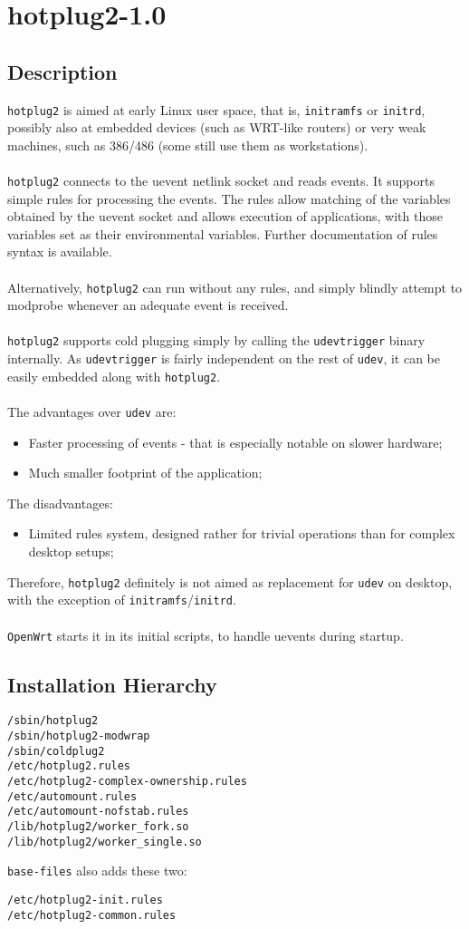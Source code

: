 \documentclass[a4paper]{report}
\begin{document}
\chapter{hotplug2-1.0}
\section{Description}
{\tt hotplug2} is aimed at early Linux user space, that is, {\tt initramfs} 
or {\tt initrd}, possibly also at embedded devices (such as WRT-like routers) 
or very weak machines, such as 386/486 (some still use them as workstations).\\\\
{\tt hotplug2} connects to the uevent netlink socket and reads events. It supports
simple rules for processing the events. The rules allow matching of the
variables obtained by the uevent socket and allows execution of applications,
with those variables set as their environmental variables. Further
documentation of rules syntax is available.\\\\
Alternatively, {\tt hotplug2} can run without any rules, and simply blindly attempt
to modprobe whenever an adequate event is received.\\\\
{\tt hotplug2} supports cold plugging simply by calling the {\tt udevtrigger} binary
internally. As {\tt udevtrigger} is fairly independent on the rest of {\tt udev}, 
it can be easily embedded along with {\tt hotplug2}.\\\\
The advantages over {\tt udev} are:
\begin{itemize}
    \item Faster processing of events - that is especially notable on slower hardware;
    \item Much smaller footprint of the application; 
\end{itemize}
The disadvantages:
\begin{itemize}
    \item Limited rules system, designed rather for trivial operations than
          for complex desktop setups;
\end{itemize}
Therefore, {\tt hotplug2} definitely is not aimed as replacement
for {\tt udev} on desktop, with the exception of {\tt initramfs}/{\tt initrd}.\\\\
{\tt OpenWrt} starts it in its initial scripts, to handle uevents during startup.
\section{Installation Hierarchy}
\begin{lstlisting}
/sbin/hotplug2
/sbin/hotplug2-modwrap
/sbin/coldplug2
/etc/hotplug2.rules
/etc/hotplug2-complex-ownership.rules
/etc/automount.rules
/etc/automount-nofstab.rules
/lib/hotplug2/worker_fork.so
/lib/hotplug2/worker_single.so
\end{lstlisting}
{\tt base-files} also adds these two:
\begin{lstlisting}
/etc/hotplug2-init.rules
/etc/hotplug2-common.rules
\end{lstlisting}
\end{document}
